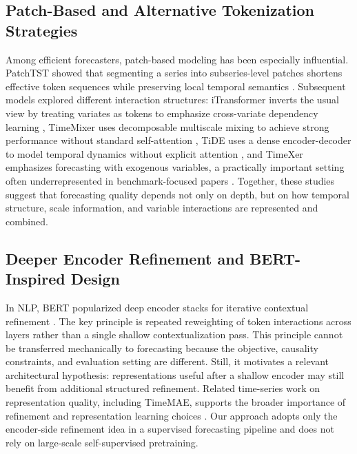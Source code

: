 \documentclass{ieeeaccess}
\begin{document}
\subsection{Patch-Based and Alternative Tokenization Strategies}
Among efficient forecasters, patch-based modeling has been especially influential.
PatchTST showed that segmenting a series into subseries-level patches shortens
effective token sequences while preserving local temporal semantics
\cite{nie2023patchtst}. Subsequent models explored different interaction structures:
iTransformer inverts the usual view by treating variates as tokens to emphasize
cross-variate dependency learning \cite{liu2024itransformer}, TimeMixer uses
decomposable multiscale mixing to achieve strong performance without standard
self-attention \cite{wang2024timemixer}, TiDE uses a dense encoder-decoder to model
temporal dynamics without explicit attention \cite{das2023tide}, and TimeXer
emphasizes forecasting with exogenous variables, a practically important setting
often underrepresented in benchmark-focused papers \cite{wang2024timexer}. Together,
these studies suggest that forecasting quality depends not only on depth, but on how
temporal structure, scale information, and variable interactions are represented and
combined.

\subsection{Deeper Encoder Refinement and BERT-Inspired Design}
In NLP, BERT popularized deep encoder stacks for iterative contextual refinement
\cite{devlin2019bert}. The key principle is repeated reweighting of token interactions
across layers rather than a single shallow contextualization pass. This principle
cannot be transferred mechanically to forecasting because the objective, causality
constraints, and evaluation setting are different. Still, it motivates a relevant
architectural hypothesis: representations useful after a shallow encoder may still
benefit from additional structured refinement. Related time-series work on
representation quality, including TimeMAE, supports the broader importance of
refinement and representation learning choices \cite{cheng2023timemae,selfattention2024tsf}.
Our approach adopts only the encoder-side refinement idea in a supervised forecasting
pipeline and does not rely on large-scale self-supervised pretraining.
\end{document}
